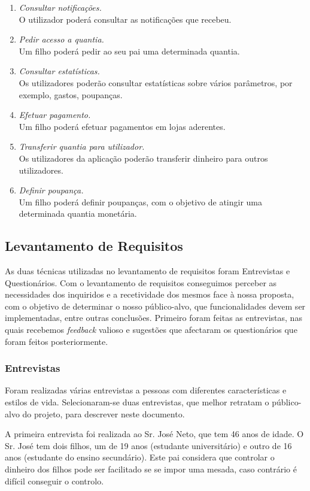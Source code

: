 \documentclass{article}
\begin{document}
\begin{enumerate}
      \item \emph{Consultar notificações.}\\
O utilizador poderá consultar as notificações que recebeu.
      \item \emph{Pedir acesso a quantia.}\\
Um filho poderá pedir ao seu pai uma determinada quantia.
      \item \emph{Consultar estatísticas.}\\
Os utilizadores poderão consultar estatísticas sobre vários parâmetros, por exemplo, gastos, poupanças.
      \item \emph{Efetuar pagamento.}\\
Um filho poderá efetuar pagamentos em lojas aderentes.
      \item \emph{Transferir quantia para utilizador.}\\
Os utilizadores da aplicação poderão transferir dinheiro para outros utilizadores.
      \item \emph{Definir poupança.}\\
Um filho poderá definir poupanças, com o objetivo de atingir uma determinada quantia monetária.
    \end{enumerate}


  \subsection{Levantamento de Requisitos}
    As duas técnicas utilizadas no levantamento de requisitos foram Entrevistas e Questionários. Com o levantamento de requisitos conseguimos perceber as necessidades dos inquiridos e a recetividade dos mesmos face à nossa proposta, com o objetivo de determinar o nosso público-alvo, que funcionalidades devem ser implementadas, entre outras conclusões. Primeiro foram feitas as entrevistas, nas quais recebemos \emph{feedback} valioso e sugestões que afectaram os questionários que foram feitos posteriormente.

    \subsubsection{Entrevistas}

      Foram realizadas várias entrevistas a pessoas com diferentes características e estilos de vida. Selecionaram-se duas entrevistas, que melhor retratam o público-alvo do projeto, para descrever neste documento.

      A primeira entrevista foi realizada ao Sr. José Neto, que tem 46 anos de idade. O Sr. José tem dois filhos, um de 19 anos (estudante universitário) e outro de 16 anos (estudante do ensino secundário). Este pai considera que controlar o dinheiro dos filhos pode ser facilitado se se impor uma mesada, caso contrário é difícil conseguir o controlo. 
\end{document}
